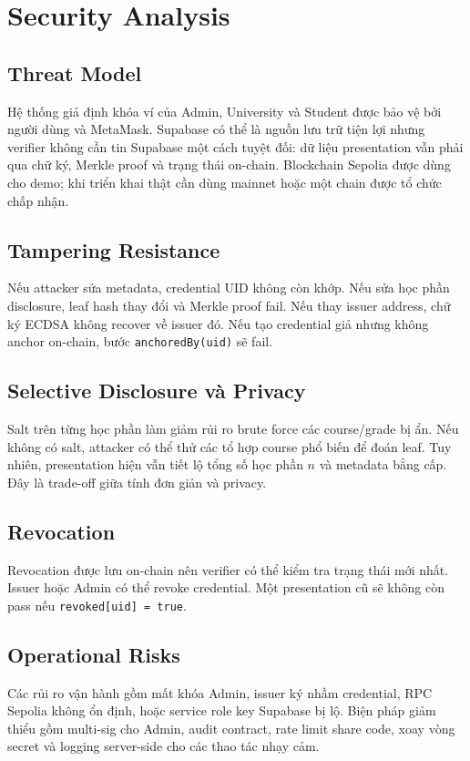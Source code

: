 \section{Security Analysis}

\subsection{Threat Model}

Hệ thống giả định khóa ví của Admin, University và Student được bảo vệ bởi người dùng và MetaMask. Supabase có thể là nguồn lưu trữ tiện lợi nhưng verifier không cần tin Supabase một cách tuyệt đối: dữ liệu presentation vẫn phải qua chữ ký, Merkle proof và trạng thái on-chain. Blockchain Sepolia được dùng cho demo; khi triển khai thật cần dùng mainnet hoặc một chain được tổ chức chấp nhận.

\subsection{Tampering Resistance}

Nếu attacker sửa metadata, credential UID không còn khớp. Nếu sửa học phần disclosure, leaf hash thay đổi và Merkle proof fail. Nếu thay issuer address, chữ ký ECDSA không recover về issuer đó. Nếu tạo credential giả nhưng không anchor on-chain, bước \texttt{anchoredBy(uid)} sẽ fail.

\subsection{Selective Disclosure và Privacy}

Salt trên từng học phần làm giảm rủi ro brute force các course/grade bị ẩn. Nếu không có salt, attacker có thể thử các tổ hợp course phổ biến để đoán leaf. Tuy nhiên, presentation hiện vẫn tiết lộ tổng số học phần $n$ và metadata bằng cấp. Đây là trade-off giữa tính đơn giản và privacy.

\subsection{Revocation}

Revocation được lưu on-chain nên verifier có thể kiểm tra trạng thái mới nhất. Issuer hoặc Admin có thể revoke credential. Một presentation cũ sẽ không còn pass nếu \texttt{revoked[uid] = true}.

\subsection{Operational Risks}

Các rủi ro vận hành gồm mất khóa Admin, issuer ký nhầm credential, RPC Sepolia không ổn định, hoặc service role key Supabase bị lộ. Biện pháp giảm thiểu gồm multi-sig cho Admin, audit contract, rate limit share code, xoay vòng secret và logging server-side cho các thao tác nhạy cảm.
